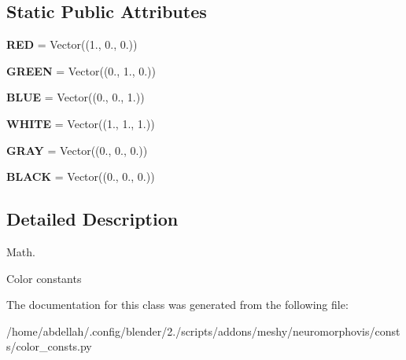 \subsection*{Static Public Attributes}
\begin{DoxyCompactItemize}
\item 
{\bfseries R\+ED} = Vector((1., 0., 0.))\hypertarget{classmeshy_1_1neuromorphovis_1_1consts_1_1color__consts_1_1Color_ad40393a383aa81d269833b152aca469f}{}\label{classmeshy_1_1neuromorphovis_1_1consts_1_1color__consts_1_1Color_ad40393a383aa81d269833b152aca469f}

\item 
{\bfseries G\+R\+E\+EN} = Vector((0., 1., 0.))\hypertarget{classmeshy_1_1neuromorphovis_1_1consts_1_1color__consts_1_1Color_a2e82787beba226b670aeacf2b66c685f}{}\label{classmeshy_1_1neuromorphovis_1_1consts_1_1color__consts_1_1Color_a2e82787beba226b670aeacf2b66c685f}

\item 
{\bfseries B\+L\+UE} = Vector((0., 0., 1.))\hypertarget{classmeshy_1_1neuromorphovis_1_1consts_1_1color__consts_1_1Color_a811542912ee692286bd7e04ae587781d}{}\label{classmeshy_1_1neuromorphovis_1_1consts_1_1color__consts_1_1Color_a811542912ee692286bd7e04ae587781d}

\item 
{\bfseries W\+H\+I\+TE} = Vector((1., 1., 1.))\hypertarget{classmeshy_1_1neuromorphovis_1_1consts_1_1color__consts_1_1Color_a49d76d1a4ea17935a83df717ab1df8e9}{}\label{classmeshy_1_1neuromorphovis_1_1consts_1_1color__consts_1_1Color_a49d76d1a4ea17935a83df717ab1df8e9}

\item 
{\bfseries G\+R\+AY} = Vector((0., 0., 0.))\hypertarget{classmeshy_1_1neuromorphovis_1_1consts_1_1color__consts_1_1Color_abe517cc171acbd5178458ba11c51c275}{}\label{classmeshy_1_1neuromorphovis_1_1consts_1_1color__consts_1_1Color_abe517cc171acbd5178458ba11c51c275}

\item 
{\bfseries B\+L\+A\+CK} = Vector((0., 0., 0.))\hypertarget{classmeshy_1_1neuromorphovis_1_1consts_1_1color__consts_1_1Color_a4c64896f181d4319b470c9242dc204d2}{}\label{classmeshy_1_1neuromorphovis_1_1consts_1_1color__consts_1_1Color_a4c64896f181d4319b470c9242dc204d2}

\end{DoxyCompactItemize}


\subsection{Detailed Description}
Math. 

\begin{DoxyVerb}Color constants
\end{DoxyVerb}
 

The documentation for this class was generated from the following file\+:\begin{DoxyCompactItemize}
\item 
/home/abdellah/.\+config/blender/2./scripts/addons/meshy/neuromorphovis/consts/color\+\_\+consts.\+py\end{DoxyCompactItemize}
